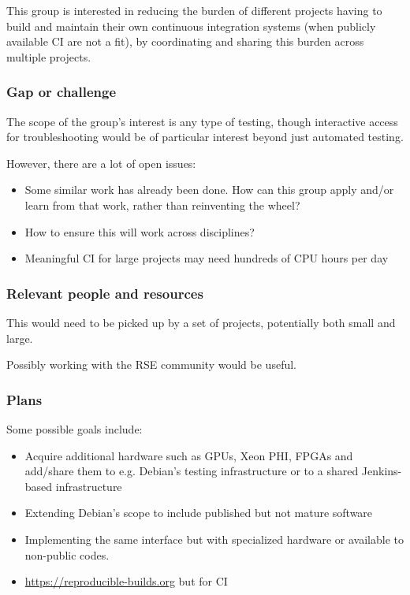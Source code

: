 This group is interested in reducing the burden of different projects having to build and maintain their own continuous integration systems (when publicly available CI are not a fit), by coordinating and sharing this burden across multiple projects.

\subsubsection{Gap or challenge}

The scope of the group's interest is any type of testing, though interactive access for troubleshooting would be of particular interest beyond just automated testing.

However, there are a lot of open issues:

\begin{itemize}
\item Some similar work has already been done.  How can this group apply and/or learn from that work, rather than reinventing the wheel?
\item How to ensure this will work across disciplines?
\item Meaningful CI for large projects may need hundreds of CPU hours per day
\end{itemize}


\subsubsection{Relevant people and resources}

This would need to be picked up by a set of projects, potentially both small and large.

Possibly working with the RSE community would be useful.

\subsubsection{Plans}

Some possible goals include:
\begin{itemize}
\item Acquire additional hardware such as GPUs, Xeon PHI, FPGAs and add/share them to e.g. Debian's testing infrastructure or to a shared Jenkins-based infrastructure
\item Extending Debian's scope to include published but not mature software
\item Implementing the same interface but with specialized hardware or available to non-public codes.
\item \url{https://reproducible-builds.org} but for CI
\end{itemize}

